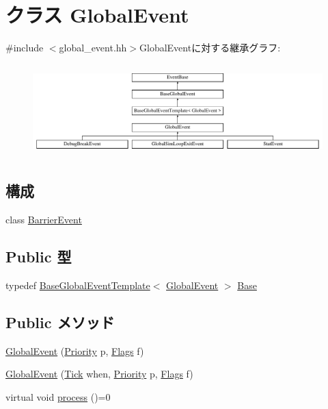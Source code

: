 \hypertarget{classGlobalEvent}{
\section{クラス GlobalEvent}
\label{classGlobalEvent}
}


{\ttfamily \#include $<$global\_\-event.hh$>$}GlobalEventに対する継承グラフ:\begin{figure}[H]
\begin{center}
\leavevmode
\includegraphics[height=3.61757cm]{classGlobalEvent}
\end{center}
\end{figure}
\subsection*{構成}
\begin{DoxyCompactItemize}
\item 
class \hyperlink{classGlobalEvent_1_1BarrierEvent}{BarrierEvent}
\end{DoxyCompactItemize}
\subsection*{Public 型}
\begin{DoxyCompactItemize}
\item 
typedef \hyperlink{classBaseGlobalEventTemplate}{BaseGlobalEventTemplate}$<$ \hyperlink{classGlobalEvent}{GlobalEvent} $>$ \hyperlink{classGlobalEvent_a20e777cac0612b0f7713b46884762e3f}{Base}
\end{DoxyCompactItemize}
\subsection*{Public メソッド}
\begin{DoxyCompactItemize}
\item 
\hyperlink{classGlobalEvent_a28d42a7a12d6603c52d0c22134038676}{GlobalEvent} (\hyperlink{classEventBase_a6d92f7ee8144a5911ed46d85a89a4934}{Priority} p, \hyperlink{classFlags}{Flags} f)
\item 
\hyperlink{classGlobalEvent_a89acea2fd06692ad052931b6dd1ebc8e}{GlobalEvent} (\hyperlink{base_2types_8hh_a5c8ed81b7d238c9083e1037ba6d61643}{Tick} when, \hyperlink{classEventBase_a6d92f7ee8144a5911ed46d85a89a4934}{Priority} p, \hyperlink{classFlags}{Flags} f)
\item 
virtual void \hyperlink{classGlobalEvent_a142b75b68a6291400e20fb0dd905b1c8}{process} ()=0
\end{DoxyCompactItemize}


